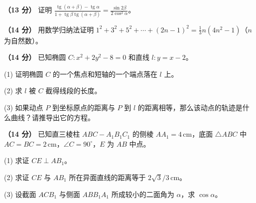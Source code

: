 \begin{question}
\textbf{（13 分）} 证明 $\displaystyle\frac{\operatorname{tg}(\alpha+\beta)-\operatorname{tg}\alpha}{1+\operatorname{tg}\beta\operatorname{tg}(\alpha+\beta)}=\frac{\sin2\beta}{2\cos^2\alpha}$。

\end{question}
\begin{question}
\textbf{（14 分）} 用数学归纳法证明 $1^2+3^2+5^2+\cdots +(2n-1)^2=\frac13n(4n^2-1)$（$n$ 为自然数）。

\end{question}
\begin{question}
\textbf{（14 分）} 已知椭圆 $C:x^2+2y^2-8=0$ 和直线 $l:y=x-2$。

(1) 证明椭圆 $C$ 的一个焦点和短轴的一个端点落在 $l$ 上。

(2) 求 $l$ 被 $C$ 截得线段的长度。

(3) 如果动点 $P$ 到坐标原点的距离与 $P$ 到 $l$ 的距离相等，那么该动点的轨迹是什么曲线？请推导出它的方程。

\Needspace{0.4\textheight}
\end{question}
\begin{question}
\textbf{（14 分）} 已知直三棱柱 $ABC-A_1B_1C_1$ 的侧棱 $AA_1=4\,\mathrm{cm}$，底面 $\triangle ABC$ 中 $AC=BC=2\,\mathrm{cm}$，$\angle C=90^\circ$，$E$ 为 $AB$ 中点。

(1) 求证 $CE\perp AB_1$。

(2) 求证 $CE$ 与 $AB_1$ 所在异面直线的距离等于 $2\sqrt3/3\,\mathrm{cm}$。

(3) 设截面 $ACB_1$ 与侧面 $ABB_1A_1$ 所成较小的二面角为 $\alpha$，求 $\cos\alpha$。
\nopagebreak[4]
\begin{center}\end{center}
\nopagebreak[4]

\end{question}